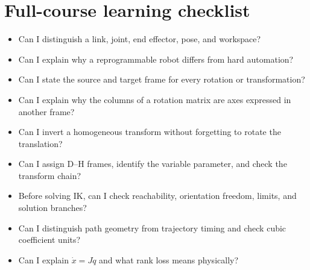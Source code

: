 \documentclass[11pt,a4paper]{article}
\begin{document}
\section{\enspace Full-course learning checklist}
\begin{itemize}
\item Can I distinguish a link, joint, end effector, pose, and workspace?
\item Can I explain why a reprogrammable robot differs from hard automation?
\item Can I state the source and target frame for every rotation or transformation?
\item Can I explain why the columns of a rotation matrix are axes expressed in another frame?
\item Can I invert a homogeneous transform without forgetting to rotate the translation?
\item Can I assign D--H frames, identify the variable parameter, and check the transform chain?
\item Before solving IK, can I check reachability, orientation freedom, limits, and solution branches?
\item Can I distinguish path geometry from trajectory timing and check cubic coefficient units?
\item Can I explain $\dot x=J\dot q$ and what rank loss means physically?
\end{itemize}
\end{document}

